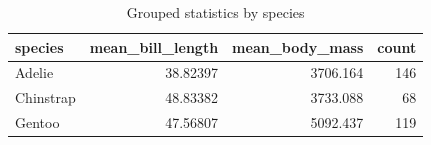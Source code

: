 \begin{table}

\caption{Grouped statistics by species}
\centering
\begin{tabular}[t]{l|r|r|r}
\hline
species & mean\_bill\_length & mean\_body\_mass & count\\
\hline
Adelie & 38.82397 & 3706.164 & 146\\
\hline
Chinstrap & 48.83382 & 3733.088 & 68\\
\hline
Gentoo & 47.56807 & 5092.437 & 119\\
\hline
\end{tabular}
\end{table}
